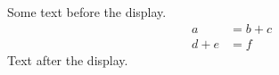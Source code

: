 \documentclass[12pt]{article}
\begin{document}
Some text before the display.
\begin{align} a &= b + c \\ d + e &= f \end{align}
Text after the display.
\end{document}
